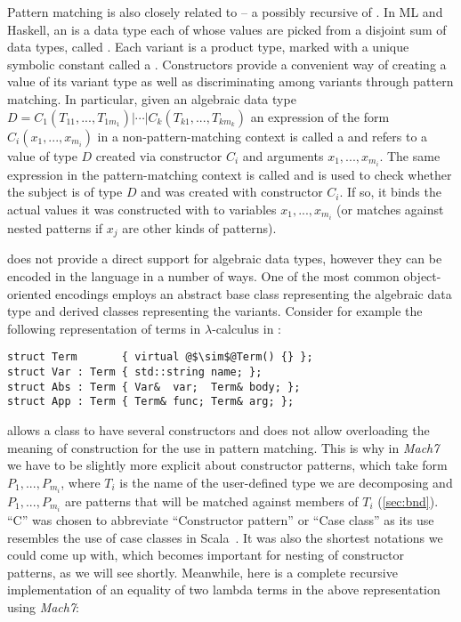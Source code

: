 
Pattern matching is also closely related to  -- a 
possibly recursive  of . In ML and Haskell, an 
 is a data type each of whose values are picked from a 
disjoint sum of data types, called . Each variant is a product 
type, marked with a unique symbolic constant called a . 
Constructors provide a convenient way of creating a value of its variant type as 
well as discriminating among variants through pattern matching. In particular,
given an algebraic data type $D = C_1(T_{11},...,T_{1m_1}) | \cdots | C_k(T_{k1},...,T_{km_k})$
an expression of the form $C_i(x_1,...,x_{m_i})$ in a non-pattern-matching 
context is called a  and refers to a value of type $D$ 
created via constructor $C_i$ and arguments $x_1,...,x_{m_i}$. The same 
expression in the pattern-matching context is called  
and is used to check whether the subject is of type $D$ and was created with 
constructor $C_i$. If so, it binds the actual values it was constructed with to  
variables $x_1,...,x_{m_i}$ (or matches against nested patterns if $x_j$ are 
other kinds of patterns).

\Cpp{} does not provide a direct support for algebraic data types, however they 
can be encoded in the language in a number of ways. One of the most common 
object-oriented encodings employs an abstract base class representing the 
algebraic data type and derived classes representing the variants. Consider for 
example the following representation of terms in $\lambda$-calculus in \Cpp{}:

\begin{lstlisting}[columns=flexible]
struct Term       { virtual @$\sim$@Term() {} };
struct Var : Term { std::string name; };
struct Abs : Term { Var&  var;  Term& body; };
struct App : Term { Term& func; Term& arg; };
\end{lstlisting}

\noindent
\Cpp{} allows a class to have several constructors and does not allow 
overloading the meaning of construction for the use in pattern matching. This is
why in \emph{Mach7} we have to be slightly more explicit about constructor patterns, 
which take form $P_1,...,P_{m_i}$\code{)}, where $T_i$ is the name of 
the user-defined type we are decomposing and $P_1,...,P_{m_i}$ are patterns that 
will be matched against members of $T_i$ (\textsection\ref{sec:bnd}). ``C'' was
chosen to abbreviate ``Constructor pattern'' or ``Case class'' as its use 
resembles the use of case classes in Scala~\cite{Scala2nd}. It was also the 
shortest notations we could come up with, which becomes important for nesting of 
constructor patterns, as we will see shortly. Meanwhile, here is a complete 
recursive implementation of an equality of two lambda terms in the above 
representation using \emph{Mach7}:

